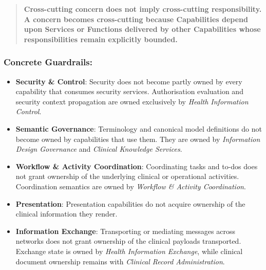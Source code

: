 \begin{quote}

\textbf{Cross-cutting concern does not imply cross-cutting responsibility. A concern becomes cross-cutting because Capabilities depend upon Services or Functions delivered by other Capabilities whose responsibilities remain explicitly bounded.}


\end{quote}
\label{rad:metamodel:248}
\subsubsection*{Concrete Guardrails:}
\label{rad:metamodel:249}

\begin{itemize}

\item 
\textbf{Security \& Control}: Security does not become partly owned by every capability that consumes security services. Authorisation evaluation and security context propagation are owned exclusively by \emph{Health Information Control}.



\item 
\textbf{Semantic Governance}: Terminology and canonical model definitions do not become owned by capabilities that use them. They are owned by \emph{Information Design Governance} and \emph{Clinical Knowledge Services}.



\item 
\textbf{Workflow \& Activity Coordination}: Coordinating tasks and to-dos does not grant ownership of the underlying clinical or operational activities. Coordination semantics are owned by \emph{Workflow \& Activity Coordination}.



\item 
\textbf{Presentation}: Presentation capabilities do not acquire ownership of the clinical information they render.



\item 
\textbf{Information Exchange}: Transporting or mediating messages across networks does not grant ownership of the clinical payloads transported. Exchange state is owned by \emph{Health Information Exchange}, while clinical document ownership remains with \emph{Clinical Record Administration}.



\end{itemize}
\label{rad:metamodel:255}

